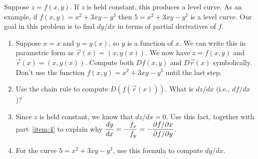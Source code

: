 \begin{problem}%
%
 Suppose $z=f(x,y)$.  If $z$ is held constant, this produces a level curve. As an example, if $f(x,y) = x^2+3xy-y^3$ then $5=x^2+3xy-y^3$ is a level curve. Our goal in this problem is to find $dy/dx$ in terms of partial derivatives of $f$.
\begin{enumerate}
 \item Suppose $x=x$ and $y=y(x)$, so $y$ is a function of $x$.  We can write this in parametric form as $\vec r(x) = (x,y(x))$. We now have $z=f(x,y)$ and $\vec r(x)=(x,y(x))$.  Compute both $Df(x,y)$ and $D\vec r(x)$ symbolically.  Don't use the function $f(x,y)=x^2+3xy-y^3$ until the last step. 
 \item\label{item:4} Use the chain rule to compute $D(f(\vec r(x)))$. What is $dz/dx$ (i.e., $df/dx$)?
 \item Since $z$ is held constant, we know that $dz/dx=0$. Use this fact, together with part~\ref{item:4} to explain why $\displaystyle \frac{dy}{dx} = -\frac{f_x}{f_y} = -\frac{\partial f/ \partial x}{\partial f/ \partial y}$.
 \item For the curve $5=x^2+3xy-y^3$, use this formula to compute $dy/dx$.
\end{enumerate}

\end{problem}



